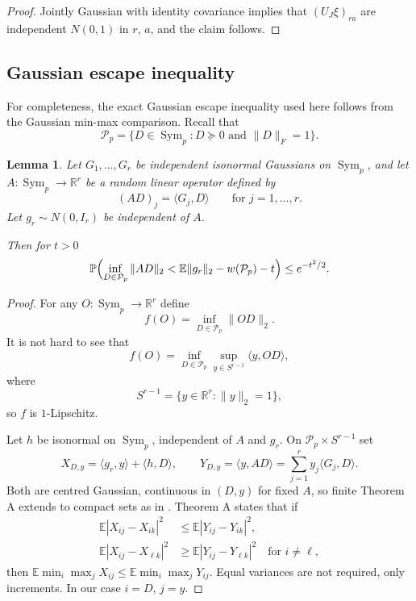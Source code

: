 \documentclass[11pt]{article}
\numberwithin{equation}{section}
\newtheorem{lemma}[theorem]{Lemma}
\theoremstyle{definition}
\theoremstyle{remark}
\newcommand{\E}{\mathbb E}
\newcommand{\1}{\boldsymbol 1}
\begin{document}
\begin{aiblock}
\begin{proof}
    Jointly Gaussian with identity covariance implies that $(U_J \xi)_{ra}$ are independent $N(0,1)$ in $r$, $a$, and the claim follows.
\end{proof}




 

\subsection{Gaussian escape inequality}\label{ssec:infeasibility_above:gaussian_escape}

For completeness, the exact Gaussian escape inequality used here follows from the Gaussian min-max comparison.
Recall that
\[
    \mathcal P_p = \{D \in \operatorname{Sym}_p : D \succeq 0 \text{~and~} \|D\|_F = 1\}.
\]

\begin{lemma} \label{lem:infeasibility_above:gaussian_escape}
    Let $G_{1}, \dots, G_{r}$ be independent isonormal Gaussians on $\operatorname{Sym}_p$, and let $A : \operatorname{Sym}_p \to \mathbb R^{r}$ be a random linear operator defined by
    \[
        (A D)_{j} = \langle G_{j}, D \rangle \qquad \text{for $j = 1, \ldots, r$}.
    \]
    Let $g_{r} \sim N(0, I_{r})$ be independent of $A$.
    
    Then for $t > 0$
    \[
        \mathbb P\Bigl(\inf_{D \in \mathcal P_{p}} \|A D\|_{2} < \E \|g_{r}\|_{2} - w(\mathcal P_{p}) - t\Bigr) \le e^{-t^{2} / 2}.
    \]
\end{lemma}

\begin{proof}
    For any $O : \operatorname{Sym}_p \to \mathbb R^{r}$ define
    \[
        f(O) = \inf_{D \in \mathcal P_{p}} \|O D\|_{2}.
    \]
    It is not hard to see that
    \[
        f(O) = \inf_{D \in \mathcal P_{p}} \sup_{y \in S^{r - 1}} \langle y, O D \rangle,
    \]
    where
    \[
        S^{r - 1} = \{y \in \mathbb R^{r} : \|y\|_{2} = 1\},
    \]
    so $f$ is $1$-Lipschitz.

    Let $h$ be isonormal on $\operatorname{Sym}_p$, independent of $A$ and $g_r$. On $\mathcal P_{p}\times S^{r - 1}$ set
    \[
        X_{D,y} = \langle g_{r}, y \rangle + \langle h, D \rangle,
        \qquad
        Y_{D,y} = \langle y, A D \rangle = \sum_{j = 1}^r y_{j} \langle G_{j}, D \rangle.
    \]
    Both are centred Gaussian, continuous in $(D, y)$ for fixed $A$, so finite Theorem A \cite[Theorem A]{Gordon1988} extends to compact sets as in \cite[Cor 1.2]{Gordon1988}.
    Theorem A states that if
    \begin{align*}
        \E|X_{ij} - X_{ik}|^{2} &\le \E|Y_{ij} - Y_{ik}|^{2}, \\
        \E|X_{ij} - X_{\ell k}|^{2} &\ge \E|Y_{ij} - Y_{\ell k}|^{2} \quad \text{for $i \ne \ell$},
    \end{align*}
    then $\E\min_{i}\max_{j} X_{ij} \le \E\min_{i}\max_{j} Y_{ij}$.
    Equal variances are not required, only increments. In our case $i = D$, $j = y$.


\end{proof}
\end{aiblock}
\end{document}
